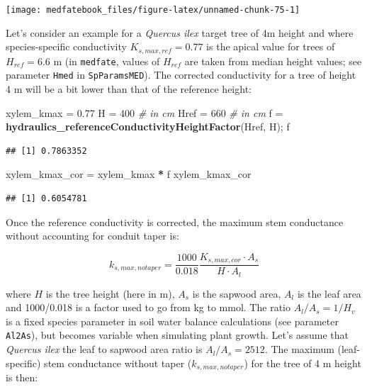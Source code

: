 \documentclass[]{book}
\newenvironment{Shaded}{\begin{snugshade}}{\end{snugshade}}
\newcommand{\KeywordTok}[1]{\textcolor[rgb]{0.13,0.29,0.53}{\textbf{#1}}}
\newcommand{\DecValTok}[1]{\textcolor[rgb]{0.00,0.00,0.81}{#1}}
\newcommand{\FloatTok}[1]{\textcolor[rgb]{0.00,0.00,0.81}{#1}}
\newcommand{\StringTok}[1]{\textcolor[rgb]{0.31,0.60,0.02}{#1}}
\newcommand{\CommentTok}[1]{\textcolor[rgb]{0.56,0.35,0.01}{\textit{#1}}}
\newcommand{\OperatorTok}[1]{\textcolor[rgb]{0.81,0.36,0.00}{\textbf{#1}}}
\newcommand{\NormalTok}[1]{#1}
\begin{document}
\begin{center}\texttt{[image: medfatebook\_files/figure-latex/unnamed-chunk-75-1]} \end{center}

Let's consider an example for a \emph{Quercus ilex} target tree of 4m
height and where species-specific conductivity \(K_{s,max,ref} = 0.77\)
is the apical value for trees of \(H_{ref} = 6.6\) m (in
\texttt{medfate}, values of \(H_{ref}\) are taken from median height
values; see parameter \texttt{Hmed} in \texttt{SpParamsMED}). The
corrected conductivity for a tree of height 4 m will be a bit lower than
that of the reference height:

\begin{Shaded}
\begin{Highlighting}[]
\NormalTok{xylem_kmax =}\StringTok{ }\FloatTok{0.77}
\NormalTok{H =}\StringTok{ }\DecValTok{400} \CommentTok{# in cm}
\NormalTok{Href =}\StringTok{ }\DecValTok{660} \CommentTok{# in cm}
\NormalTok{f =}\StringTok{ }\KeywordTok{hydraulics_referenceConductivityHeightFactor}\NormalTok{(Href, H);}
\NormalTok{f}
\end{Highlighting}
\end{Shaded}

\begin{verbatim}
## [1] 0.7863352
\end{verbatim}

\begin{Shaded}
\begin{Highlighting}[]
\NormalTok{xylem_kmax_cor =}\StringTok{ }\NormalTok{xylem_kmax }\OperatorTok{*}\StringTok{ }\NormalTok{f}
\NormalTok{xylem_kmax_cor}
\end{Highlighting}
\end{Shaded}

\begin{verbatim}
## [1] 0.6054781
\end{verbatim}

Once the reference conductivity is corrected, the maximum stem
conductance without accounting for conduit taper is:

\begin{equation}
k_{s,max, notaper}=\frac{1000}{0.018} \frac{K_{s,max,cor}\cdot A_{s}}{H\cdot A_{l}}
\end{equation}

where \(H\) is the tree height (here in m), \(A_{s}\) is the sapwood
area, \(A_{l}\) is the leaf area and 1000/0.018 is a factor used to go
from kg to mmol. The ratio \(A_{l}/A_{s} = 1/H_v\) is a fixed species
parameter in soil water balance calculations (see parameter
\texttt{Al2As}), but becomes variable when simulating plant growth.
Let's assume that \emph{Quercus ilex} the leaf to sapwood area ratio is
\(A_{l}/A_{s} = 2512\). The maximum (leaf-specific) stem conductance
without taper (\(k_{s, max, notaper}\)) for the tree of 4 m height is
then:
\end{document}
